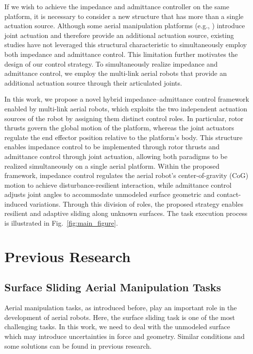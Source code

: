 If we wish to achieve the impedance and admittance controller on the same platform, it is necessary to consider a new structure that has more than a single actuation source. Although some aerial manipulation platforms (e.g., \cite{lippiello_2012_cartesian, cataldi_2016_impedance}) introduce joint actuation and therefore provide an additional actuation source, existing studies have not leveraged this structural characteristic to simultaneously employ both impedance and admittance control. This limitation further motivates the design of our control strategy. To simultaneously realize impedance and admittance control, we employ the multi-link aerial robots that provide an additional actuation source through their articulated joints.

In this work, we propose a novel hybrid impedance--admittance control framework enabled by multi-link aerial robots, which exploits the two independent actuation sources of the robot by assigning them distinct control roles. In particular, rotor thrusts govern the global motion of the platform, whereas the joint actuators regulate the end effector position relative to the platform's body. This structure enables impedance control to be implemented through rotor thrusts and admittance control through joint actuation, allowing both paradigms to be realized simultaneously on a single aerial platform. Within the proposed framework, impedance control regulates the aerial robot's center-of-gravity (CoG) motion to achieve disturbance-resilient interaction, while admittance control adjusts joint angles to accommodate unmodeled surface geometric and contact-induced variations. Through this division of roles, the proposed strategy enables resilient and adaptive sliding along unknown surfaces. The task execution process is illustrated in Fig.~\ref{fig:main_figure}.


\section{Previous Research}

\subsection{Surface Sliding Aerial Manipulation Tasks}

Aerial manipulation tasks, as introduced before, play an important role in the development of aerial robots. Here, the surface sliding task is one of the most challenging tasks. In this work, we need to deal with the unmodeled surface which may introduce uncertainties in force and geometry. Similar conditions and some solutions can be found in previous research.

